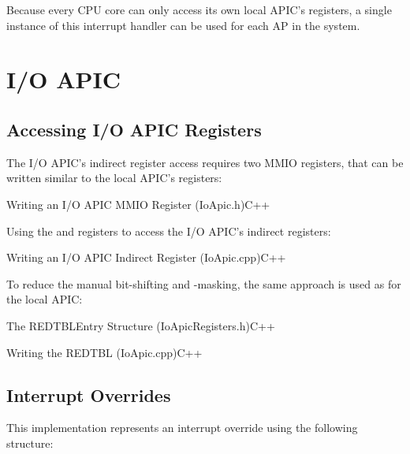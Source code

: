 Because every CPU core can only access its own local APIC's registers, a single instance of this interrupt handler can be used for each AP in the system.

\clearpage

\section{I/O APIC}
\label{sec:apxioapic}

\subsection{Accessing I/O APIC Registers}
\label{subsec:iolistings}

The I/O APIC's indirect register access requires two MMIO registers, that can be written similar to the local APIC's registers:

\begin{codeblock}{Writing an I/O APIC MMIO Register (IoApic.h)}{C++}
\end{codeblock}

Using the  and  registers to access the I/O APIC's indirect registers:

\begin{codeblock}{Writing an I/O APIC Indirect Register (IoApic.cpp)}{C++}
\end{codeblock}

To reduce the manual bit-shifting and -masking, the same approach is used as for the local APIC\@:

\begin{codeblock}[label=lst:redtblentry]{The REDTBLEntry Structure (IoApicRegisters.h)}{C++}
\end{codeblock}

\begin{codeblock}[label=lst:writeredtbl]{Writing the REDTBL (IoApic.cpp)}{C++}
\end{codeblock}

\subsection{Interrupt Overrides}
\label{subsec:apxirqoverrides}

This implementation represents an interrupt override using the following structure:

